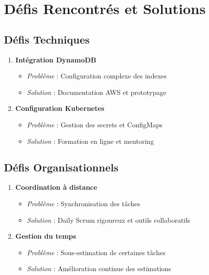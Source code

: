 \section{Défis Rencontrés et Solutions}

\subsection{Défis Techniques}

\begin{enumerate}
    \item \textbf{Intégration DynamoDB}
    \begin{itemize}
        \item \textit{Problème} : Configuration complexe des indexes
        \item \textit{Solution} : Documentation AWS et prototypage
    \end{itemize}
    
    \item \textbf{Configuration Kubernetes}
    \begin{itemize}
        \item \textit{Problème} : Gestion des secrets et ConfigMaps
        \item \textit{Solution} : Formation en ligne et mentoring
    \end{itemize}
\end{enumerate}

\subsection{Défis Organisationnels}

\begin{enumerate}
    \item \textbf{Coordination à distance}
    \begin{itemize}
        \item \textit{Problème} : Synchronisation des tâches
        \item \textit{Solution} : Daily Scrum rigoureux et outils collaboratifs
    \end{itemize}
    
    \item \textbf{Gestion du temps}
    \begin{itemize}
        \item \textit{Problème} : Sous-estimation de certaines tâches
        \item \textit{Solution} : Amélioration continue des estimations
    \end{itemize}
\end{enumerate}

